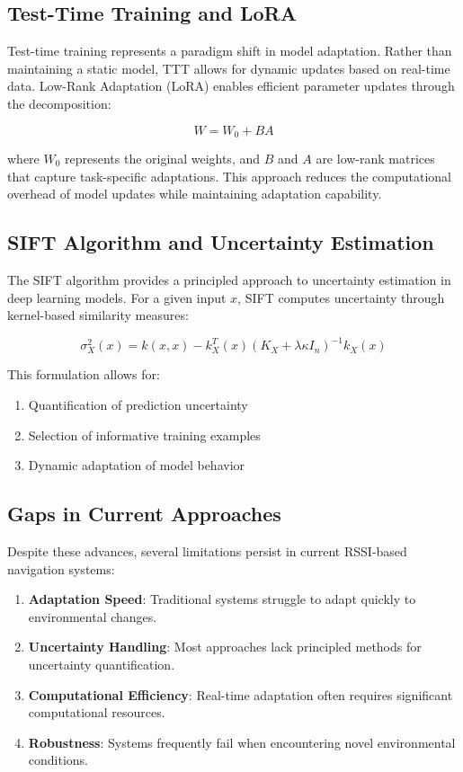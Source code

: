 \documentclass[12pt]{article}
\begin{document}
\subsection{Test-Time Training and LoRA}

Test-time training represents a paradigm shift in model adaptation. Rather than maintaining a static model, TTT allows for dynamic updates based on real-time data. Low-Rank Adaptation (LoRA) enables efficient parameter updates through the decomposition:

\[
W = W_0 + BA
\]

where $W_0$ represents the original weights, and $B$ and $A$ are low-rank matrices that capture task-specific adaptations. This approach reduces the computational overhead of model updates while maintaining adaptation capability.

\subsection{SIFT Algorithm and Uncertainty Estimation}

The SIFT algorithm provides a principled approach to uncertainty estimation in deep learning models. For a given input $x$, SIFT computes uncertainty through kernel-based similarity measures:

\[
\sigma^2_X(x) = k(x,x) - k^T_X(x)(K_X + \lambda\kappa I_n)^{-1}k_X(x)
\]

This formulation allows for:
\begin{enumerate}
    \item Quantification of prediction uncertainty
    \item Selection of informative training examples
    \item Dynamic adaptation of model behavior
\end{enumerate}

\subsection{Gaps in Current Approaches}

Despite these advances, several limitations persist in current RSSI-based navigation systems:
\begin{enumerate}
    \item \textbf{Adaptation Speed}: Traditional systems struggle to adapt quickly to environmental changes.
    \item \textbf{Uncertainty Handling}: Most approaches lack principled methods for uncertainty quantification.
    \item \textbf{Computational Efficiency}: Real-time adaptation often requires significant computational resources.
    \item \textbf{Robustness}: Systems frequently fail when encountering novel environmental conditions.
\end{enumerate}
\end{document}
